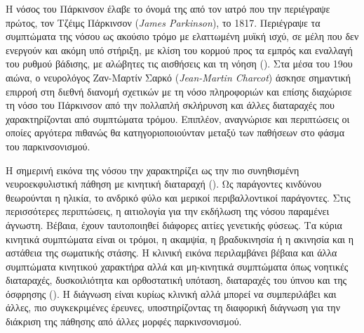 \documentclass[12pt]{report}
\makeatletter
\let\oldchapter\chapter
\renewcommand{\chapter}{\@ifstar{\starchapter}{\nostarchapter}}
\newcommand{\starchapter}[1]{\oldchapter*{#1}\thispagestyle{mainstyle}}
\newcommand{\nostarchapter}[1]{\oldchapter{#1}\thispagestyle{mainstyle}}
\makeatother
\begin{document}
    \chapter{Εισαγωγή}
        Η νόσος του Πάρκινσον έλαβε το όνομά της από τον ιατρό που την περιέγραψε πρώτος, τον Τζέιμς Πάρκινσον (\emph{James Parkinson}), το 1817. Περιέγραψε τα συμπτώματα της νόσου ως ακούσιο τρόμο με ελαττωμένη μυϊκή ισχύ, σε μέλη που δεν ενεργούν και ακόμη υπό στήριξη, με κλίση του κορμού προς τα εμπρός και εναλλαγή του ρυθμού βάδισης, με αλώβητες τις αισθήσεις και τη νόηση (\emph{\cite{Goetz2011TheTherapies}}). Στα μέσα του 19ου αιώνα, ο νευρολόγος Ζαν-Μαρτίν Σαρκό (\emph{Jean-Martin Charcot}) άσκησε σημαντική επιρροή στη διεθνή διανομή σχετικών με τη νόσο πληροφοριών και επίσης διαχώρισε τη νόσο του Πάρκινσον από την πολλαπλή σκλήρυνση και άλλες διαταραχές που χαρακτηρίζονται από συμπτώματα τρόμου. Επιπλέον, αναγνώρισε και περιπτώσεις οι οποίες αργότερα πιθανώς θα κατηγοριοποιούνταν μεταξύ των παθήσεων στο φάσμα του παρκινσονισμού.
        \par
        Η σημερινή εικόνα της νόσου την χαρακτηρίζει ως την πιο συνηθισμένη νευροεκφυλιστική πάθηση με κινητική διαταραχή (\emph{\cite{Balestrino2020ParkinsonDisease}}). Ως παράγοντες κινδύνου θεωρούνται η ηλικία, το ανδρικό φύλο και μερικοί περιβαλλοντικοί παράγοντες. Στις περισσότερες περιπτώσεις, η αιτιολογία για την εκδήλωση της νόσου παραμένει άγνωστη. Βέβαια, έχουν ταυτοποιηθεί διάφορες αιτίες γενετικής φύσεως. Τα κύρια κινητικά συμπτώματα είναι οι τρόμοι, η ακαμψία, η βραδυκινησία ή η ακινησία και η αστάθεια της σωματικής στάσης. Η κλινική εικόνα περιλαμβάνει βέβαια και άλλα συμπτώματα κινητικού χαρακτήρα αλλά και μη-κινητικά συμπτώματα όπως νοητικές διαταραχές, δυσκοιλιότητα και ορθοστατική υπόταση, διαταραχές του ύπνου και της όσφρησης (\emph{\cite{Trevisan2024GeneticsPerspectives}}). Η διάγνωση είναι κυρίως κλινική αλλά μπορεί να συμπεριλάβει και άλλες, πιο συγκεκριμένες έρευνες, υποστηρίζοντας τη διαφορική διάγνωση για την διάκριση της πάθησης από άλλες μορφές παρκινσονισμού.
        
\end{document}
